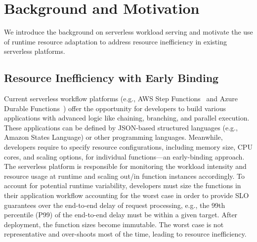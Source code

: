 \section{Background and Motivation}
\label{sec:background}

We introduce the background on serverless workload serving and motivate the use of runtime resource adaptation to address resource inefficiency in existing serverless platforms.

\subsection{Resource Inefficiency with Early Binding}
Current serverless workflow platforms (e.g., AWS Step Functions~\cite{aws-step-function} and Azure Durable Functions~\cite{azure-durable-function}) offer the opportunity for developers to build various applications with advanced logic like chaining, branching, and parallel execution.
These applications can be defined by JSON-based structured languages (e.g., Amazon States Language) or other programming languages.
Meanwhile, developers require to specify resource configurations, including memory size, CPU cores, and scaling options, for individual functions---an early-binding approach.
The serverless platform is responsible for monitoring the workload intensity and resource usage at runtime and scaling out/in function instances accordingly.
To account for potential runtime variability, developers must size the functions in their application workflow accounting for the worst case in order to provide SLO guarantees over the end-to-end delay of request processing, e.g., the 99th percentile (P99) of the end-to-end delay must be within a given target. 
After deployment, the function sizes become immutable. The worst case is not representative and over-shoots most of the time, leading to resource inefficiency. 



